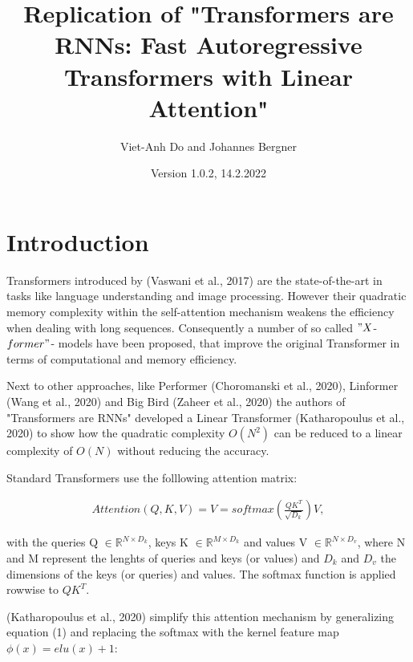 \documentclass[DIV=13,fontsize=11pt]{scrartcl}
\title{Replication of "Transformers are RNNs: Fast Autoregressive Transformers with Linear Attention"}
\author{Viet-Anh Do and Johannes Bergner}
\date{Version 1.0.2, 14.2.2022}
\begin{document}
\maketitle
\section{Introduction}

Transformers introduced by (Vaswani et al., 2017) are the state-of-the-art in  tasks like language understanding and image processing.  However their quadratic memory complexity within the self-attention mechanism weakens the efficiency when dealing with long sequences.  
Consequently a number of so called \("X\)-\(former"\)- models have been proposed, that improve the original Transformer in terms of computational and memory efficiency.

Next to other approaches, like Performer (Choromanski et al., 2020), Linformer (Wang et al., 2020) and Big Bird (Zaheer et al., 2020) the authors of "Transformers are RNNs" developed a Linear Transformer (Katharopoulus et al., 2020) to show how the quadratic complexity \(O(N^2)\)  can be reduced to a linear complexity of \(O(N)\) without reducing the accuracy.

Standard Transformers use the folllowing attention matrix:

\begin{align}
    Attention(Q, K, V) {=} V {=} softmax \left(\frac {QK^T}{\sqrt{D_{k}}}\right) V,
\end{align}

with the queries Q \( \in \mathbb{R}^{N \times D_{k}}\),  keys K \(\in \mathbb{R}^{M \times D_{k}}\) and values V \( \in \mathbb{R}^{N \times D_{v}}\), where N and M represent the lenghts of queries and keys (or values) and \(D_{k}\) and \(D_{v}\) the dimensions of the keys (or queries) and values. The softmax function is applied rowwise to \(QK^T\).

(Katharopoulus et al., 2020) simplify this attention mechanism by generalizing equation (1) and replacing the softmax with the kernel feature map \(\phi (x) {=} elu(x) +1\):
\end{document}
